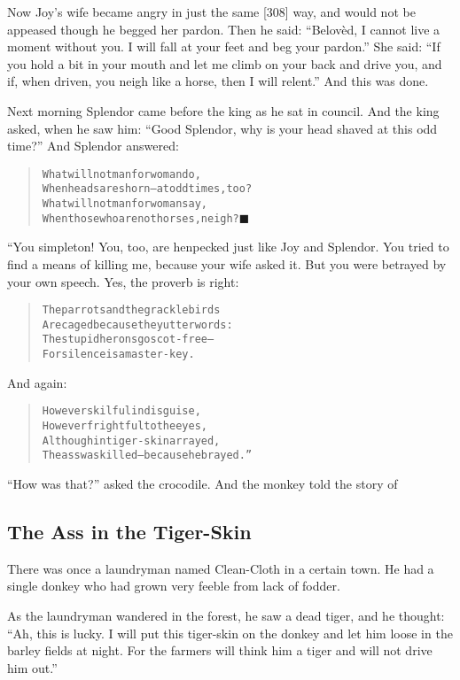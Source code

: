 \documentclass[article, twoside, 14pt]{memoir}
\newcommand{\qed}{\hfill \ensuremath{\blacksquare}}
\renewenvironment{verbatim}{%
\begin{quote}%
\vskip -10pt%
\begin{alltt}\normalfont\large}{\end{alltt}%
\end{quote}%
\vskip -10pt
} %
\begin{document}
Now Joy's wife became angry in just the same [308] way, and would
not be appeased though he begged her pardon. Then he said:
``Belovèd, I cannot live a moment without you. I will fall at your feet and beg your pardon.''
She said:
``If you hold a bit in your mouth and let me climb on your back and drive you, and if, when driven, you neigh like a horse, then I will relent.''
And this was done.

Next morning Splendor came before the king as he sat in council.
And the king asked, when he saw him:
``Good Splendor, why is your head shaved at this odd time?'' And
Splendor answered:

\begin{verbatim}
What will not man for woman do,
When heads are shorn--at odd times, too?
What will not man for woman say,
When those who are not horses, neigh?\hyperref[s72]{\qed}
\end{verbatim}
“You simpleton! You, too, are henpecked just like Joy and Splendor.
You tried to find a means of killing me, because your wife asked
it. But you were betrayed by your own speech. Yes, the proverb is
right:

\begin{verbatim}
The parrots and the grackle birds
Are caged because they utter words:
The stupid herons go scot-free--
For silence is a master-key.
\end{verbatim}
And again:

\begin{verbatim}
However skilful in disguise,
However frightful to the eyes,
Although in tiger-skin arrayed,
The ass was killed--because he brayed.”
\end{verbatim}
``How was that?'' asked the crocodile. And the monkey told the
story of

\subsection{The Ass in the Tiger-Skin}

\label{s73}

There was once a laundryman named Clean-Cloth in a certain town. He
had a single donkey who had grown very feeble from lack of fodder.

As the laundryman wandered in the forest, he saw a dead tiger, and
he thought:
``Ah, this is lucky. I will put this tiger-skin on the donkey and let him loose in the barley fields at night. For the farmers will think him a tiger and will not drive him out.''
\end{document}
